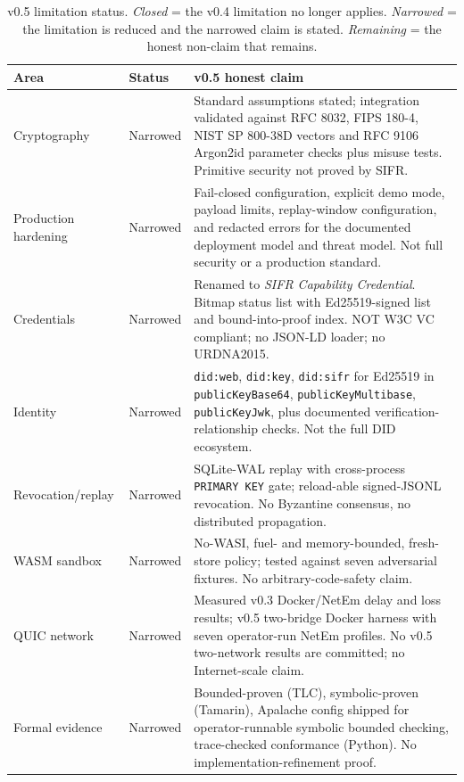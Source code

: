 \documentclass[runningheads]{llncs}
\begin{document}
\begin{table}[t]
\centering
\small
\caption{v0.5 limitation status. \emph{Closed} = the v0.4 limitation no
longer applies. \emph{Narrowed} = the limitation is reduced and the
narrowed claim is stated. \emph{Remaining} = the honest non-claim that
remains.}
\label{tab:limitations-final}
\begin{tabular}{p{2.4cm}p{1.3cm}p{12cm}}
\toprule
Area & Status & v0.5 honest claim \\
\midrule
Cryptography &
Narrowed &
Standard assumptions stated; integration validated against RFC 8032,
FIPS 180-4, NIST SP 800-38D vectors and RFC 9106 Argon2id parameter
checks plus misuse tests.
Primitive security not proved by SIFR. \\
Production hardening &
Narrowed &
Fail-closed configuration, explicit demo mode, payload limits, replay-window
configuration, and redacted errors for the documented deployment model and
threat model. Not full security or a production standard. \\
Credentials &
Narrowed &
Renamed to \emph{SIFR Capability Credential}. Bitmap status list with
Ed25519-signed list and bound-into-proof index. NOT W3C VC compliant;
no JSON-LD loader; no URDNA2015. \\
Identity &
Narrowed &
\texttt{did:web}, \texttt{did:key}, \texttt{did:sifr} for Ed25519 in
\texttt{publicKeyBase64}, \texttt{publicKeyMultibase},
\texttt{publicKeyJwk}, plus documented verification-relationship checks.
Not the full DID ecosystem. \\
Revocation/replay &
Narrowed &
SQLite-WAL replay with cross-process \texttt{PRIMARY KEY} gate;
reload-able signed-JSONL revocation. No Byzantine consensus, no
distributed propagation. \\
WASM sandbox &
Narrowed &
No-WASI, fuel- and memory-bounded, fresh-store policy; tested against
seven adversarial fixtures. No arbitrary-code-safety claim. \\
QUIC network &
Narrowed &
Measured v0.3 Docker/NetEm delay and loss results; v0.5 two-bridge Docker
harness with seven operator-run NetEm profiles. No v0.5 two-network results
are committed; no Internet-scale claim. \\
Formal evidence &
Narrowed &
Bounded-proven (TLC), symbolic-proven (Tamarin), Apalache config shipped
for operator-runnable symbolic bounded checking, trace-checked
conformance (Python). No implementation-refinement proof. \\
\bottomrule
\end{tabular}
\end{table}
\end{document}

